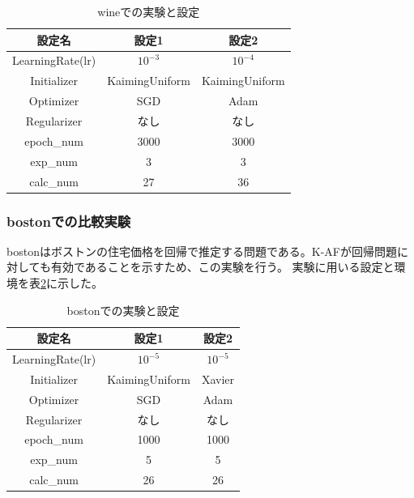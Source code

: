 \begin{table}[htbp]
    \begin{center}
        \caption{wineでの実験と設定}
        \label{exp:wine}
        \vspace{2mm} 
        \begin{tabular}{ |c|c|c| }
        設定名 & 設定1 & 設定2 \\
        \hline
        LearningRate(lr)         & $ 10^{-3} $ & $ 10^{-4} $ \\
        Initializer       & KaimingUniform & KaimingUniform \\
        Optimizer           & SGD & Adam \\
        Regularizer     & なし & なし \\
        epoch\_num       & 3000 &  3000 \\
        exp\_num         & 3 & 3 \\
        calc\_num        & 27 & 36 \\
        \end{tabular}
    \end{center}
\end{table}


\subsubsection{bostonでの比較実験}
\label{impl:boston}

bostonはボストンの住宅価格を回帰で推定する問題である。K-AFが回帰問題に対しても有効であることを示すため、この実験を行う。
実験に用いる設定と環境を表\ref{exp:boston}に示した。

\begin{table}[htbp]
    \begin{center}
        \caption{bostonでの実験と設定}
        \label{exp:boston}
        \vspace{2mm} 
        \begin{tabular}{ |c|c|c| }
        設定名 & 設定1 & 設定2 \\
        \hline
        LearningRate(lr)         & $ 10^{-5} $ & $ 10^{-5} $ \\
        Initializer       & KaimingUniform  & Xavier \\
        Optimizer           & SGD & Adam \\
        Regularizer     & なし & なし \\
        epoch\_num       & 1000 &  1000 \\
        exp\_num         & 5 & 5 \\
        calc\_num        & 26 & 26 \\
        \end{tabular}
    \end{center}
\end{table}


